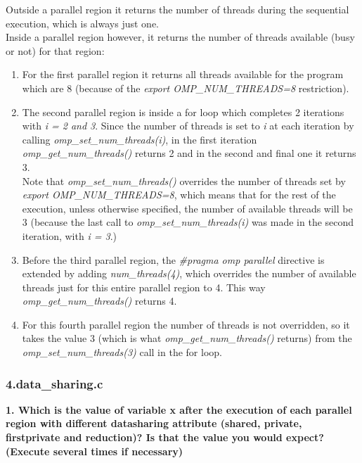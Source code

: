 \documentclass[12]{article}
\begin{document}
Outside a parallel region it returns the number of threads during the sequential execution, which is always just one.
\\
Inside a parallel region however, it returns the number of threads available (busy or not) for that region:
\begin{enumerate}
    \item For the first parallel region it returns all threads available for the program which are 8 (because of the \textit{export OMP\_NUM\_THREADS=8} restriction).
    \item  The second parallel region is inside a for loop which completes 2 iterations with \textit{i = 2 and 3}. Since the number of threads is set to \textit{i} at each iteration by calling \textit{omp\_set\_num\_threads(i)}, in the first iteration \textit{omp\_get\_num\_threads()} returns 2 and in the second and final one it returns 3. \\ Note that \textit{omp\_set\_num\_threads()} overrides the number of threads set by \textit{export OMP\_NUM\_THREADS=8}, which means that for the rest of the execution, unless otherwise specified, the number of available threads will be 3 (because the last call to \textit{omp\_set\_num\_threads(i)} was made in the second iteration, with \textit{i = 3}.)  
    \item Before the third parallel region, the \textit{\#pragma omp parallel} directive is extended by adding \textit{num\_threads(4)}, which overrides the number of available threads just for this entire parallel region to 4. This way \textit{omp\_get\_num\_threads()} returns 4.
    \item For this fourth parallel region the number of threads is not overridden, so it takes the value 3 (which is what \textit{omp\_get\_num\_threads()} returns) from the \textit{omp\_set\_num\_threads(3)} call in the for loop.
\end{enumerate}

\subsubsection{4.data\_sharing.c}
\textbf{1. Which is the value of variable x after the execution of each parallel region with different datasharing
attribute (shared, private, firstprivate and reduction)? Is that the value you would expect? (Execute several times if necessary)}
\end{document}
